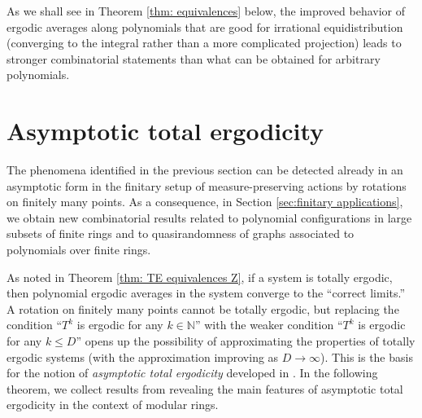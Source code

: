 \documentclass{amsart}
\theoremstyle{definition}
\numberwithin{equation}{section}
\newcommand{\N}{\mathbb{N}}
\begin{document}
As we shall see in Theorem \ref{thm: equivalences} below, the improved behavior of ergodic averages along polynomials that are good for irrational equidistribution (converging to the integral rather than a more complicated projection) leads to stronger combinatorial statements than what can be obtained for arbitrary polynomials.


\section{Asymptotic total ergodicity} \label{sec:ATE}

The phenomena identified in the previous section can be detected already in an asymptotic form in the finitary setup of measure-preserving actions by rotations on finitely many points.
As a consequence, in Section \ref{sec:finitary applications}, we obtain new combinatorial results related to polynomial configurations in large subsets of finite rings and to quasirandomness of graphs associated to polynomials over finite rings.

As noted in Theorem \ref{thm: TE equivalences Z}, if a system is totally ergodic, then polynomial ergodic averages in the system converge to the ``correct limits.''
A rotation on finitely many points cannot be totally ergodic, but replacing the condition ``$T^k$ is ergodic for any $k \in \N$'' with the weaker condition ``$T^k$ is ergodic for any $k \le D$'' opens up the possibility of approximating the properties of totally ergodic systems (with the approximation improving as $D \to \infty$).
This is the basis for the notion of \emph{asymptotic total ergodicity} developed in \cite{bb1, bb2}.
In the following theorem, we collect results from \cite{bb1} revealing the main features of asymptotic total ergodicity in the context of modular rings.
\end{document}
